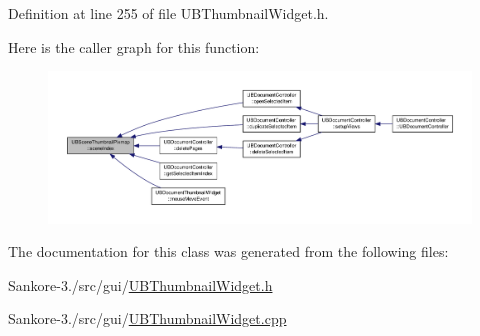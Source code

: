 Definition at line 255 of file U\-B\-Thumbnail\-Widget.\-h.



Here is the caller graph for this function\-:
\nopagebreak
\begin{figure}[H]
\begin{center}
\leavevmode
\includegraphics[width=350pt]{d1/d64/class_u_b_scene_thumbnail_pixmap_a9bc67f587cd73ff2119dd6aa06a07871_icgraph}
\end{center}
\end{figure}




The documentation for this class was generated from the following files\-:\begin{DoxyCompactItemize}
\item 
Sankore-\/3./src/gui/\hyperlink{_u_b_thumbnail_widget_8h}{U\-B\-Thumbnail\-Widget.\-h}\item 
Sankore-\/3./src/gui/\hyperlink{_u_b_thumbnail_widget_8cpp}{U\-B\-Thumbnail\-Widget.\-cpp}\end{DoxyCompactItemize}
